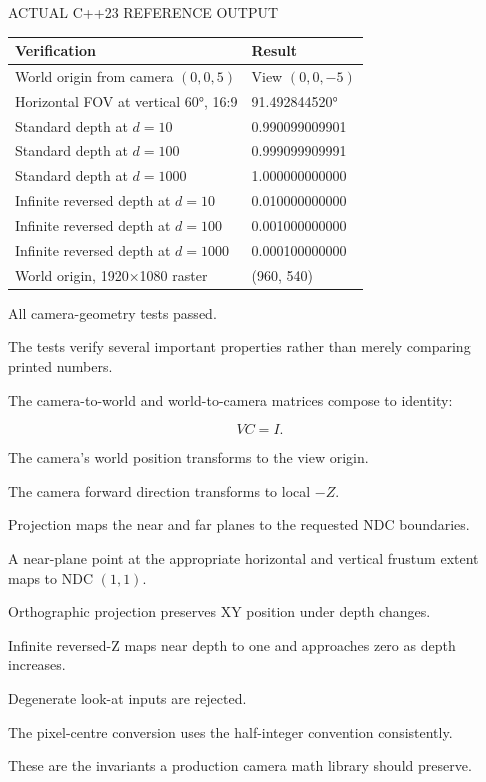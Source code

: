 ACTUAL C++23 REFERENCE OUTPUT

{\def\LTcaptype{none} %
\begin{longtable}[]{@{}ll@{}}
\toprule\noalign{}
Verification & Result \\
\midrule\noalign{}
\endhead
\bottomrule\noalign{}
\endlastfoot
World origin from camera \((0,0,5)\) & View \((0,0,-5)\) \\
Horizontal FOV at vertical 60°, 16:9 & 91.492844520° \\
Standard depth at \(d=10\) & 0.990099009901 \\
Standard depth at \(d=100\) & 0.999099909991 \\
Standard depth at \(d=1000\) & 1.000000000000 \\
Infinite reversed depth at \(d=10\) & 0.010000000000 \\
Infinite reversed depth at \(d=100\) & 0.001000000000 \\
Infinite reversed depth at \(d=1000\) & 0.000100000000 \\
World origin, 1920×1080 raster & (960, 540) \\
\end{longtable}
}

All camera-geometry tests passed.

The tests verify several important properties rather than merely comparing printed numbers.

The camera-to-world and world-to-camera matrices compose to identity:

\[
 \boxed{VC=I}.
\]

The camera's world position transforms to the view origin.

The camera forward direction transforms to local \(-Z\).

Projection maps the near and far planes to the requested NDC boundaries.

A near-plane point at the appropriate horizontal and vertical frustum extent maps to NDC \((1,1)\).

Orthographic projection preserves XY position under depth changes.

Infinite reversed-Z maps near depth to one and approaches zero as depth increases.

Degenerate look-at inputs are rejected.

The pixel-centre conversion uses the half-integer convention consistently.

These are the invariants a production camera math library should preserve.

